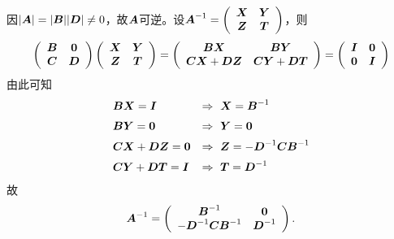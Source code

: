 \begin{frame}\ft{\secname}
\begin{jie}
  因$|\A|=|\B||\D|\ne 0$，故$\A$可逆。\pause 设$\A^{-1}=\left(
    \begin{array}{cc}
      \X&\Y\\
      \Z&\T
    \end{array}
  \right)$，则
  $$
  \left(
    \begin{array}{cc}
      \B&\zero\\
      \C&\D
    \end{array}
  \right) \left(
    \begin{array}{cc}
      \X&\Y\\
      \Z&\T
    \end{array}
  \right)=\left(
    \begin{array}{cc}
      \B\X&\B\Y\\
      \C\X+\D\Z&\C\Y+\D\T
    \end{array}
  \right) = \left(
    \begin{array}{cc}
      \II & \zero\\
      \zero & \II
    \end{array}
  \right)
  $$
\pause
  由此可知
  $$
  \begin{array}{ll}
    \B\X = \II   & \Rightarrow ~ \X = \B^{-1}\\[0.2cm]
    \B\Y = \zero & \Rightarrow ~ \Y = \zero\\[0.2cm]
    \C\X+\D\Z = \zero & \Rightarrow ~ \Z = -\D^{-1}\C\B^{-1}\\[0.2cm]
    \C\Y+\D\T = \II & \Rightarrow ~ \T = \D^{-1}
  \end{array}
  $$
\pause
  故
  $$
  \A^{-1} = \left(
    \begin{array}{cc}
      \B^{-1} & \zero\\
      -\D^{-1}\C\B^{-1} & \D^{-1}
    \end{array}
  \right).
  $$
\end{jie}
\end{frame}

